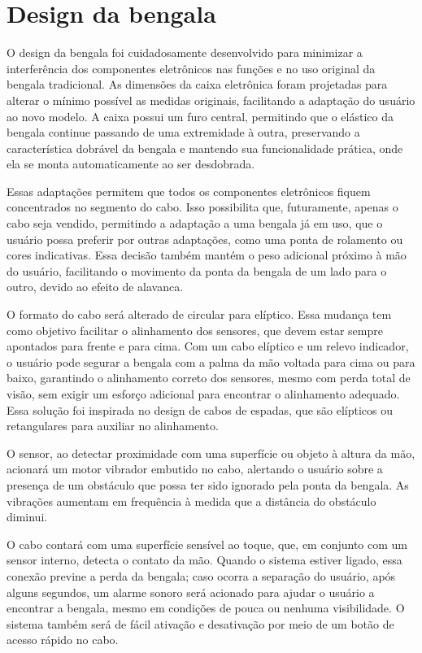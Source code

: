 \section{Design da bengala}
O design da bengala foi cuidadosamente desenvolvido para minimizar a interferência dos componentes eletrônicos nas funções e no uso original da bengala tradicional. As dimensões da caixa eletrônica foram projetadas para alterar o mínimo possível as medidas originais, facilitando a adaptação do usuário ao novo modelo. A caixa possui um furo central, permitindo que o elástico da bengala continue passando de uma extremidade à outra, preservando a característica dobrável da bengala e mantendo sua funcionalidade prática, onde ela se monta automaticamente ao ser desdobrada.

Essas adaptações permitem que todos os componentes eletrônicos fiquem concentrados no segmento do cabo. Isso possibilita que, futuramente, apenas o cabo seja vendido, permitindo a adaptação a uma bengala já em uso, que o usuário possa preferir por outras adaptações, como uma ponta de rolamento ou cores indicativas. Essa decisão também mantém o peso adicional próximo à mão do usuário, facilitando o movimento da ponta da bengala de um lado para o outro, devido ao efeito de alavanca.

O formato do cabo será alterado de circular para elíptico. Essa mudança tem como objetivo facilitar o alinhamento dos sensores, que devem estar sempre apontados para frente e para cima. Com um cabo elíptico e um relevo indicador, o usuário pode segurar a bengala com a palma da mão voltada para cima ou para baixo, garantindo o alinhamento correto dos sensores, mesmo com perda total de visão, sem exigir um esforço adicional para encontrar o alinhamento adequado. Essa solução foi inspirada no design de cabos de espadas, que são elípticos ou retangulares para auxiliar no alinhamento.

O sensor, ao detectar proximidade com uma superfície ou objeto à altura da mão, acionará um motor vibrador embutido no cabo, alertando o usuário sobre a presença de um obstáculo que possa ter sido ignorado pela ponta da bengala. As vibrações aumentam em frequência à medida que a distância do obstáculo diminui.

O cabo contará com uma superfície sensível ao toque, que, em conjunto com um sensor interno, detecta o contato da mão. Quando o sistema estiver ligado, essa conexão previne a perda da bengala; caso ocorra a separação do usuário, após alguns segundos, um alarme sonoro será acionado para ajudar o usuário a encontrar a bengala, mesmo em condições de pouca ou nenhuma visibilidade. O sistema também será de fácil ativação e desativação por meio de um botão de acesso rápido no cabo.

